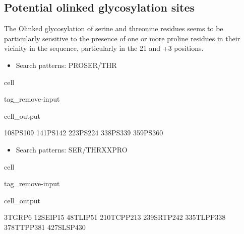 \documentclass[letterpaper,10pt,english]{jupyterBook}
\begin{document}
\subsection{Potential o\sphinxhyphen{}linked glycosylation sites}
\label{\detokenize{ipynb/chapter1:potential-o-linked-glycosylation-sites}}
\sphinxAtStartPar
The O\sphinxhyphen{}linked glycosylation of serine and threonine residues seems to be particularly sensitive to the presence of one or more proline residues in their vicinity in the sequence, particularly in the 2\sphinxhyphen{}1 and +3 positions.
\begin{itemize}
\item {} 
\sphinxAtStartPar
Search patterns: PRO\sphinxhyphen{}SER/THR

\end{itemize}

\begin{sphinxuseclass}{cell}
\begin{sphinxuseclass}{tag_remove-input}\begin{sphinxVerbatimOutput}

\begin{sphinxuseclass}{cell_output}
\begin{sphinxVerbatim}[commandchars=\\\{\}]
108\PYGZhy{}PS\PYGZhy{}109
141\PYGZhy{}PS\PYGZhy{}142
223\PYGZhy{}PS\PYGZhy{}224
338\PYGZhy{}PS\PYGZhy{}339
359\PYGZhy{}PS\PYGZhy{}360
\end{sphinxVerbatim}

\end{sphinxuseclass}\end{sphinxVerbatimOutput}

\end{sphinxuseclass}
\end{sphinxuseclass}\begin{itemize}
\item {} 
\sphinxAtStartPar
Search patterns: SER/THR\sphinxhyphen{}X\sphinxhyphen{}X\sphinxhyphen{}PRO

\end{itemize}

\begin{sphinxuseclass}{cell}
\begin{sphinxuseclass}{tag_remove-input}\begin{sphinxVerbatimOutput}

\begin{sphinxuseclass}{cell_output}
\begin{sphinxVerbatim}[commandchars=\\\{\}]
3\PYGZhy{}TGRP\PYGZhy{}6
12\PYGZhy{}SEIP\PYGZhy{}15
48\PYGZhy{}TLIP\PYGZhy{}51
210\PYGZhy{}TCPP\PYGZhy{}213
239\PYGZhy{}SRTP\PYGZhy{}242
335\PYGZhy{}TLPP\PYGZhy{}338
378\PYGZhy{}TTPP\PYGZhy{}381
427\PYGZhy{}SLSP\PYGZhy{}430
\end{sphinxVerbatim}

\end{sphinxuseclass}\end{sphinxVerbatimOutput}

\end{sphinxuseclass}
\end{sphinxuseclass}
\end{document}
